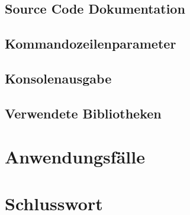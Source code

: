 \documentclass[a4paper,12pt]{article}
\begin{document}
\subsection{Source Code Dokumentation}

\subsection{Kommandozeilenparameter}

\subsection{Konsolenausgabe}


\subsection{Verwendete Bibliotheken}

\section{Anwendungsfälle}

\section{Schlusswort}
\newpage
\printbibliography
\end{document}
